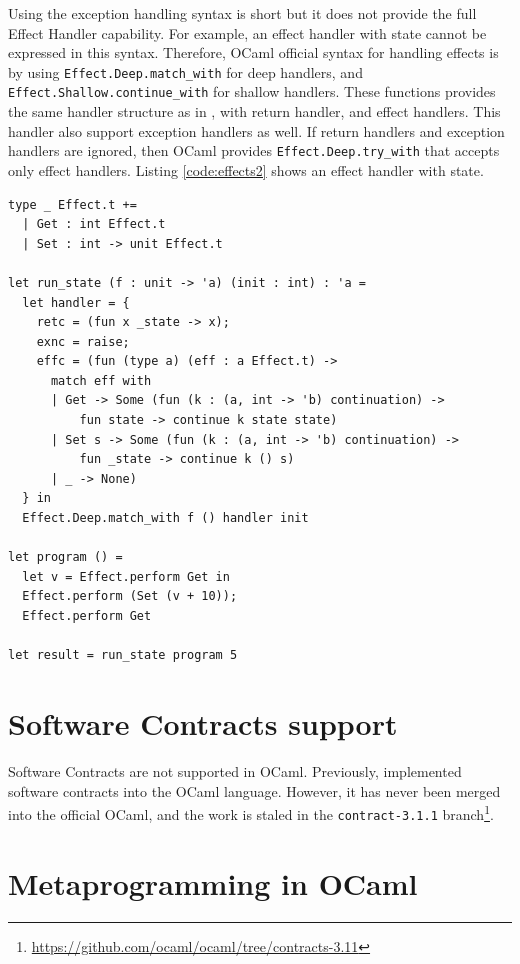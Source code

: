 Using the exception handling syntax is short but it does not provide the full Effect Handler capability. For example, an effect handler with state cannot be expressed in this syntax. Therefore, OCaml official syntax for handling effects is by using \texttt{Effect.Deep.match\_with} for deep handlers, and \texttt{Effect.Shallow.continue\_with} for shallow handlers. These functions provides the same handler structure as in \langc, with return handler, and effect handlers. This handler also support exception handlers as well. If return handlers and exception handlers are ignored, then OCaml provides \texttt{Effect.Deep.try\_with} that accepts only effect handlers. Listing \ref{code:effects2} shows an effect handler with state.

\begin{listing}
\begin{verbatim}
type _ Effect.t +=
  | Get : int Effect.t
  | Set : int -> unit Effect.t

let run_state (f : unit -> 'a) (init : int) : 'a =
  let handler = {
    retc = (fun x _state -> x);
    exnc = raise;
    effc = (fun (type a) (eff : a Effect.t) ->
      match eff with
      | Get -> Some (fun (k : (a, int -> 'b) continuation) ->
          fun state -> continue k state state)
      | Set s -> Some (fun (k : (a, int -> 'b) continuation) ->
          fun _state -> continue k () s)
      | _ -> None)
  } in
  Effect.Deep.match_with f () handler init

let program () =
  let v = Effect.perform Get in
  Effect.perform (Set (v + 10));
  Effect.perform Get

let result = run_state program 5
\end{verbatim}
\caption{OCaml effects handler with state by \texttt{Effect.Deep.match\_with}}
\label{code:effects2}
\end{listing}

\section{Software Contracts support}

Software Contracts are not supported in OCaml. Previously, \cite{xu2014dynamic} implemented software contracts into the OCaml language. However, it has never been merged into the official OCaml, and the work is staled in the \texttt{contract-3.1.1} branch\footnote{\href{https://github.com/ocaml/ocaml/tree/contracts-3.11}{https://github.com/ocaml/ocaml/tree/contracts-3.11}}.

\section{Metaprogramming in OCaml}

